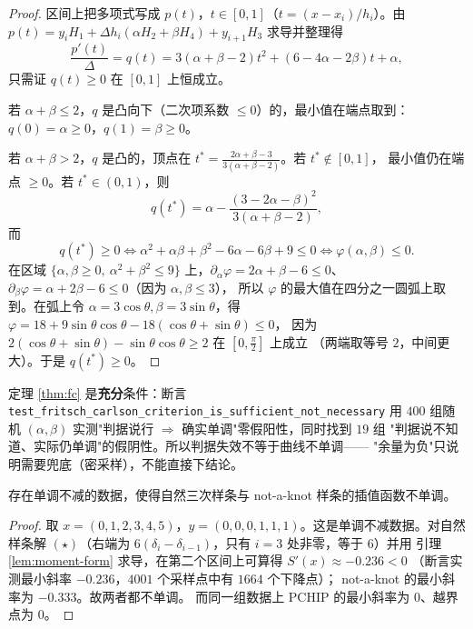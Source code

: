 \begin{proof}
区间上把多项式写成 $p(t)$，$t\in[0,1]$（$t=(x-x_i)/h_i$）。由
$p(t)=y_iH_1+\Delta h_i(\alpha H_2+\beta H_4)+y_{i+1}H_3$ 求导并整理得
\[
\frac{p'(t)}{\Delta}=q(t)=3(\alpha+\beta-2)t^2+(6-4\alpha-2\beta)t+\alpha ,
\]
只需证 $q(t)\ge0$ 在 $[0,1]$ 上恒成立。

若 $\alpha+\beta\le2$，$q$ 是凸向下（二次项系数 $\le0$）的，最小值在端点取到：
$q(0)=\alpha\ge0$，$q(1)=\beta\ge0$。

若 $\alpha+\beta>2$，$q$ 是凸的，顶点在
$t^\ast=\frac{2\alpha+\beta-3}{3(\alpha+\beta-2)}$。若 $t^\ast\notin[0,1]$，
最小值仍在端点 $\ge0$。若 $t^\ast\in(0,1)$，则
\[
q(t^\ast)=\alpha-\frac{(3-2\alpha-\beta)^2}{3(\alpha+\beta-2)},
\]
而
\[
q(t^\ast)\ge0
\iff \alpha^2+\alpha\beta+\beta^2-6\alpha-6\beta+9\le0
\iff \varphi(\alpha,\beta)\le0 .
\]
在区域 $\{\alpha,\beta\ge0,\ \alpha^2+\beta^2\le9\}$ 上，$\partial_\alpha\varphi=2\alpha+\beta-6\le0$、
$\partial_\beta\varphi=\alpha+2\beta-6\le0$（因为 $\alpha,\beta\le3$），
所以 $\varphi$ 的最大值在四分之一圆弧上取到。在弧上令
$\alpha=3\cos\theta,\beta=3\sin\theta$，得
$\varphi=18+9\sin\theta\cos\theta-18(\cos\theta+\sin\theta)\le0$，
因为 $2(\cos\theta+\sin\theta)-\sin\theta\cos\theta\ge2$ 在 $[0,\tfrac\pi2]$ 上成立
（两端取等号 $2$，中间更大）。于是 $q(t^\ast)\ge0$。
\end{proof}

\begin{remark}
定理 \ref{thm:fc} 是\textbf{充分}条件：断言
\texttt{test\_fritsch\_carlson\_criterion\_is\_sufficient\_not\_necessary} 用 $400$ 组随机
$(\alpha,\beta)$ 实测"判据说行 $\Rightarrow$ 确实单调"零假阳性，同时找到 $19$ 组
"判据说不知道、实际仍单调"的假阴性。所以判据失效不等于曲线不单调——
"余量为负"只说明需要兜底（密采样），不能直接下结论。
\end{remark}

\begin{theorem}[形状保持不是样条的性质]
\label{thm:shape}
存在单调不减的数据，使得自然三次样条与 not-a-knot 样条的插值函数不单调。
\end{theorem}

\begin{proof}
取 $x=(0,1,2,3,4,5)$，$y=(0,0,0,1,1,1)$。这是单调不减数据。对自然样条解
$(\star)$（右端为 $6(\delta_i-\delta_{i-1})$，只有 $i=3$ 处非零，等于 $6$）并用
引理 \ref{lem:moment-form} 求导，在第二个区间上可算得 $S'(x)\approx-0.236<0$
（断言实测最小斜率 $-0.236$，$4001$ 个采样点中有 $1664$ 个下降点）；
not-a-knot 的最小斜率为 $-0.333$。故两者都不单调。
而同一组数据上 PCHIP 的最小斜率为 $0$、越界点为 $0$。
\end{proof}

